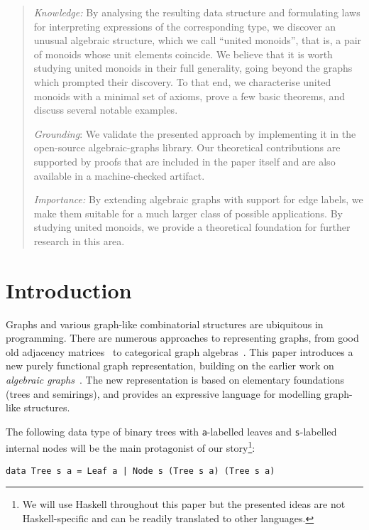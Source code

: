 \documentclass[english,submission]{programming}
\newcommand{\hcode}[1]{{\color{darkblue} \lstinline[keywordstyle={}]|#1|}} %
\begin{document}
\begin{abstract}
\emph{Knowledge:} By analysing the resulting data structure and formulating laws
for interpreting expressions of the corresponding type, we discover an unusual
algebraic structure, which we call ``united monoids'', that is, a pair of
monoids whose unit elements coincide. We believe that it is worth studying
united monoids in their full generality, going beyond the graphs which prompted
their discovery. To that end, we characterise united monoids with a minimal set
of axioms, prove a few basic theorems, and discuss several notable examples.

\emph{Grounding}: We validate the presented approach by implementing it in the
open-source \textsf{algebraic-graphs} library. Our theoretical contributions
are supported by proofs that are included in the paper itself and are also
available in a machine-checked artifact.

\emph{Importance:} By extending algebraic graphs with support for edge labels,
we make them suitable for a much larger class of possible applications. By
studying united monoids, we provide a theoretical foundation for further
research in this area.
\end{abstract}

\section{Introduction}
\vspace{-1mm}

Graphs and various graph-like combinatorial structures are ubiquitous in
programming. There are numerous approaches to representing graphs, from good old
adjacency matrices~\cite{cormen2009introduction} to categorical graph
algebras~\cite{2010_selinger_survey}. This paper introduces a new purely
functional graph representation, building on the earlier work on
\emph{algebraic graphs}~\cite{mokhov_alga}. The new representation is based on
elementary foundations (trees and semirings), and provides an expressive
language for modelling graph-like structures.

The following data type of binary trees with \hcode{a}-labelled leaves and
\hcode{s}-labelled internal nodes will be the main protagonist of our
story\footnote{
    We will use Haskell throughout this paper but the presented ideas
    are not Haskell-specific and can be readily translated to other languages.
}:

\begin{lstlisting}
data Tree s a = Leaf a | Node s (Tree s a) (Tree s a)
\end{lstlisting}
\end{document}
